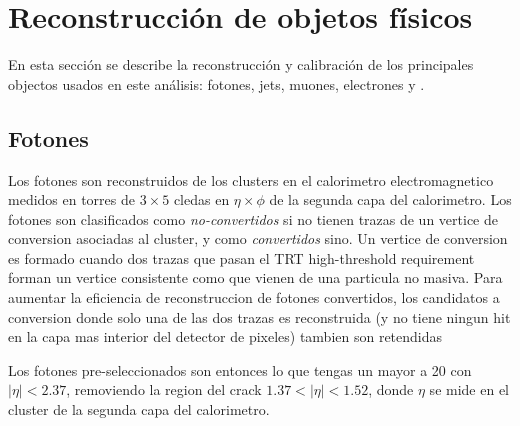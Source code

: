 \chapter{Reconstrucción de objetos físicos} %
\label{sec:obj_selection}


En esta secci\'on se describe la reconstrucci\'on y calibraci\'on de los
principales objectos usados en este an\'alisis:
fotones, jets, muones, electrones y \met.



\section{Fotones}
\label{sec:obj_photons}

Los fotones son reconstruidos de los clusters en el calorimetro electromagnetico
medidos en torres de $3\times5$ cledas en $\eta\times\phi$ de la segunda capa del
calorimetro.
Los fotones son clasificados como \emph{no-convertidos} si no tienen trazas de un vertice
de conversion asociadas al cluster, y como \emph{convertidos} sino.
Un vertice de conversion es formado cuando dos trazas que pasan el TRT high-threshold requirement
forman un vertice consistente como que vienen de una particula no masiva.
Para aumentar la eficiencia de reconstruccion de fotones convertidos, los candidatos a conversion
donde solo una de las dos trazas es reconstruida (y no tiene ningun hit en la capa mas interior
del detector de pixeles) tambien son retendidas

Los fotones pre-seleccionados son entonces lo que tengas un {\pt} mayor a
20 {\gev} con $|\eta| < 2.37$, removiendo la region del crack $1.37 < |\eta| < 1.52$,
donde $\eta$ se mide en el cluster de la segunda capa del calorimetro.

